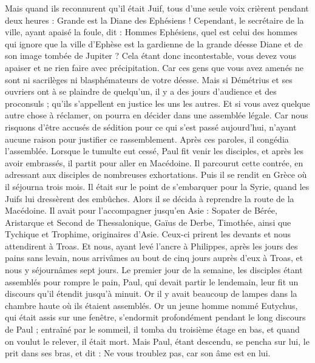 \begin{multicols}{2}
{{Mais quand ils reconnurent qu'il était Juif, tous d'une seule voix crièrent pendant deux heures : Grande est la Diane des Ephésiens !
Cependant, le secrétaire de la ville, ayant apaisé la foule, dit : Hommes Ephésiens, quel est celui des hommes qui ignore que la ville d'Ephèse est la gardienne de la grande déesse Diane et de son image tombée de Jupiter ?
Cela étant donc incontestable, vous devez vous apaiser et ne rien faire avec précipitation.
Car ces gens que vous avez amenés ne sont ni sacrilèges ni blasphémateurs de votre déesse.
Mais si Démétrius et ses ouvriers ont à se plaindre de quelqu'un, il y a des jours d'audience et des proconsuls ; qu'ils s'appellent en justice les uns les autres.
Et si vous avez quelque autre chose à réclamer, on pourra en décider dans une assemblée légale.
Car nous risquons d'être accusés de sédition pour ce qui s'est passé aujourd'hui, n'ayant aucune raison pour justifier ce rassemblement. Après ces paroles, il congédia l'assemblée.
\VerseOne{}Lorsque le tumulte eut cessé, Paul fit venir les disciples, et après les avoir embrassés, il partit pour aller en Macédoine.
Il parcourut cette contrée, en adressant aux disciples de nombreuses exhortations.
Puis il se rendit en Grèce où il séjourna trois mois. Il était sur le point de s'embarquer pour la Syrie, quand les Juifs lui dressèrent des embûches. Alors il se décida à reprendre la route de la Macédoine.
Il avait pour l'accompagner jusqu'en Asie : Sopater de Bérée, Aristarque et Second de Thessalonique, Gaïus de Derbe, Timothée, ainsi que Tychique et Trophime, originaires d'Asie.
Ceux-ci prirent les devants et nous attendirent à Troas.
Et nous, ayant levé l'ancre à Philippes, après les jours des pains sans levain, nous arrivâmes au bout de cinq jours auprès d'eux à Troas, et nous y séjournâmes sept jours.
Le premier jour de la semaine, les disciples étant assemblés pour rompre le pain, Paul, qui devait partir le lendemain, leur fit un discours qu'il étendit jusqu'à minuit.
Or il y avait beaucoup de lampes dans la chambre haute où ils étaient assemblés.
Or un jeune homme nommé Eutychus, qui était assis sur une fenêtre, s'endormit profondément pendant le long discours de Paul ; entraîné par le sommeil, il tomba du troisième étage en bas, et quand on voulut le relever, il était mort.
Mais Paul, étant descendu, se pencha sur lui, le prit dans ses bras, et dit : Ne vous troublez pas, car son âme est en lui.
}}
\end{multicols}
